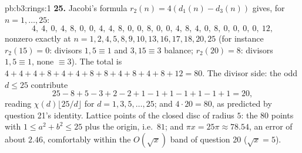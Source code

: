 \begin{solution}{pb:b3:rings:1}
\textbf{25.} Jacobi's formula $r_2(n) = 4(d_1(n) - d_3(n))$
gives, for $n = 1, \dots, 25$:
\[
4,\ 4,\ 0,\ 4,\ 8,\ 0,\ 0,\ 4,\ 4,\ 8,\ 0,\ 0,\ 8,\ 0,\ 0,\
4,\ 8,\ 4,\ 0,\ 8,\ 0,\ 0,\ 0,\ 0,\ 12,
\]
nonzero exactly at $n = 1, 2, 4, 5, 8, 9, 10, 13, 16, 17, 18,
20, 25$ (for instance $r_2(15) = 0$: divisors $1, 5 \equiv 1$
and $3, 15 \equiv 3$ balance; $r_2(20) = 8$: divisors $1, 5
\equiv 1$, none $\equiv 3$). The total is $4 + 4 + 4 + 8 + 4 +
4 + 8 + 8 + 4 + 8 + 4 + 8 + 12 = 80$. The divisor side: the
odd $d \leq 25$ contribute
\[
25 - 8 + 5 - 3 + 2 - 2 + 1 - 1 + 1 - 1 + 1 - 1 + 1 = 20,
\]
reading $\chi(d)\lfloor 25/d\rfloor$ for $d = 1, 3, 5, \dots,
25$; and $4 \cdot 20 = 80$, as predicted by question 21's
identity. Lattice points of the closed disc of radius $5$:
the $80$ points with $1 \leq a^2 + b^2 \leq 25$ plus the
origin, i.e.\ $81$; and $\pi x = 25\pi \approx 78.54$, an
error of about $2.46$, comfortably within the $O(\sqrt x)$
band of question 20 ($\sqrt x = 5$).
\end{solution}
